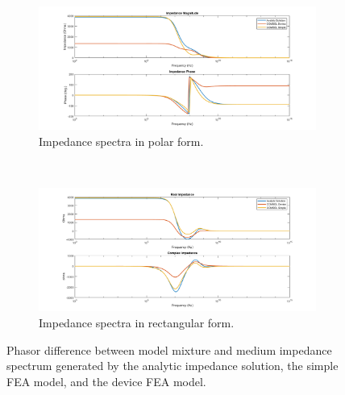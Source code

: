 \begin{figure}[h]
    \centering
    \begin{subfigure}[b]{\textwidth}
        \centering
        \includegraphics[width=\textwidth]{images/IS_model_difference_mag_phase.png}
        \caption{Impedance spectra in polar form.}
    \end{subfigure}
    \\
    \vspace{0.1 in}
    \begin{subfigure}[b]{\textwidth}
        \centering
        \includegraphics[width=\textwidth]{images/IS_model_difference_real_imag.png}
        \caption{Impedance spectra in rectangular form.}
    \end{subfigure}
    \caption[Phasor difference between model mixture and medium impedance spectrum.]{Phasor difference between model mixture and medium impedance spectrum generated by the analytic impedance solution, the simple FEA model, and the device FEA model.}
    \label{fig:single_cell_model_IS_data}
\end{figure}

